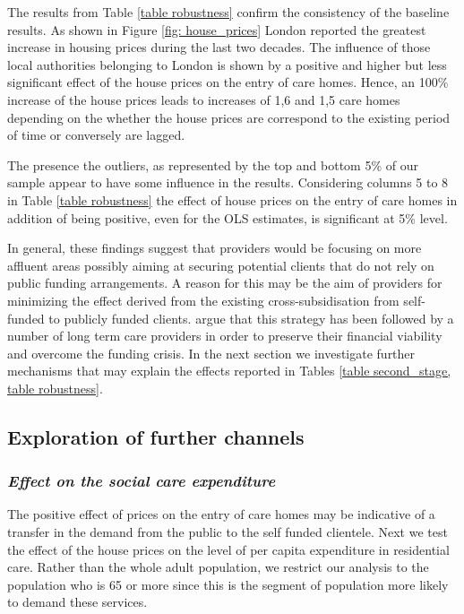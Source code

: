\documentclass[12pt,letterpaper]{article}
\begin{document}
The results from Table \ref{table robustness}  confirm the consistency of the baseline results. 
As shown in Figure \ref{fig: house_prices} London reported the greatest 
increase in housing prices during the last two decades. The influence of those local authorities 
belonging to London is shown by a positive and higher but less significant 
effect of the house prices on the entry of care homes. Hence, an 100\% increase of the 
house prices leads to increases of 1,6 and 1,5 care homes depending on the 
whether the house prices are correspond to the existing period of time or 
conversely are lagged. 

The presence the outliers, as represented by the top and bottom 5\% of our sample appear to 
have some influence in the results. Considering columns 5 to 8 in Table \ref{table robustness} 
the effect of house prices on the entry of care homes in addition of being positive, even for the OLS 
estimates, is significant at 5\% level. 

In general, these findings suggest that providers would be focusing
 on more affluent areas possibly aiming at securing potential clients that do not rely on public funding 
 arrangements. A reason for this may be the aim of providers for minimizing the effect derived
  from the existing cross-subsidisation from self-funded to publicly funded clients. 
  \citet{humphries2016social} argue that this strategy has been followed by a number of long term
   care providers in order to preserve their financial viability and overcome the funding 
   crisis. In the next section we investigate further mechanisms that may 
   explain the effects  reported in Tables \ref{table second_stage, table 
   robustness}.

\subsection{Exploration of further channels}

\subsubsection*{\normalsize{\it Effect on the social care expenditure}}

The positive effect of prices on the entry of care homes may be indicative of a transfer in the demand from the public to the self funded
clientele. Next we test the effect of the house prices on the level of per capita expenditure in 
residential care. Rather than the whole adult population, we restrict our analysis to the 
population who is 65 or more since this is the segment of population more likely 
to demand these services. 
\end{document}
